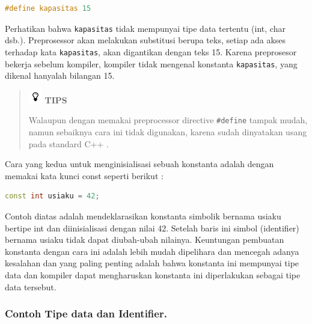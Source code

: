 \begin{lstlisting}[language=c++, numbers=none]
#define kapasitas 15
\end{lstlisting}

Perhatikan bahwa \texttt{kapasitas} tidak mempunyai tipe data tertentu
(int, char dsb.). Preprosessor akan melakukan substitusi berupa teks,
setiap ada akses terhadap kata \texttt{kapasitas}, akan digantikan
dengan teks 15. Karena preprosesor bekerja sebelum kompiler, kompiler
tidak mengenal konstanta \texttt{kapasitas}, yang dikenal hanyalah
bilangan 15.
\begin{quotation}
\includegraphics{images/tips}	\textbf{TIPS} 
	
	Walaupun
	dengan memakai preprocessor directive \texttt{\#define} tampak mudah,
	namun sebaiknya cara ini tidak digunakan, karena sudah dinyatakan usang
	pada standard C++ .
\end{quotation}
 

Cara yang kedua untuk menginisialisasi sebuah konstanta adalah dengan
memakai kata kunci const seperti berikut :

\begin{lstlisting}[language=c++, numbers=none]
const int usiaku = 42;
\end{lstlisting}

Contoh diatas adalah mendeklarasikan konstanta simbolik bernama usiaku
bertipe int dan diinisialisasi dengan nilai 42. Setelah baris ini simbol
(identifier) bernama usiaku tidak dapat diubah-ubah nilainya. Keuntungan
pembuatan konstanta dengan cara ini adalah lebih mudah dipelihara dan
mencegah adanya kesalahan dan yang paling penting adalah bahwa konstanta
ini mempunyai tipe data dan kompiler dapat mengharuskan konstanta ini
diperlakukan sebagai tipe data tersebut.

\subsubsection*{Contoh Tipe data dan Identifier.}

